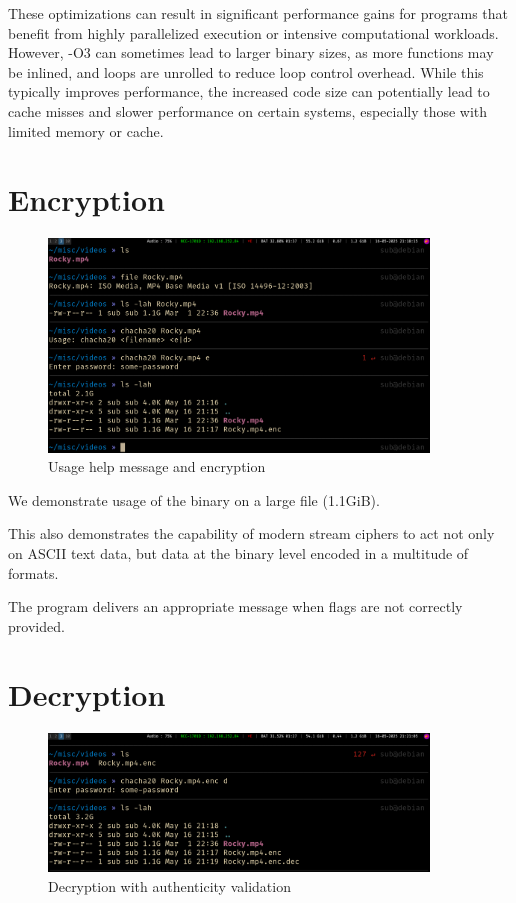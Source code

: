 \documentclass[a4paper,12pt]{report}
\begin{document}
These optimizations can result in significant performance gains for programs that benefit from highly parallelized execution or intensive computational workloads.
However, -O3 can sometimes lead to larger binary sizes, as more functions may be inlined, and loops are unrolled to reduce loop control overhead. While this typically improves performance, the increased code size can potentially lead to cache misses and slower performance on certain systems, especially those with limited memory or cache.

\section{Encryption}
\begin{figure}[h]
	\centering
	\includegraphics[width=0.9\textwidth]{../assets/2_encryption.png}
        \caption{Usage help message and encryption}
	\label{image}
\end{figure}

We demonstrate usage of the binary on a large file (1.1GiB).

This also demonstrates the capability of modern stream ciphers to act not only on ASCII text data, but data at the binary level encoded in a multitude of formats.

The program delivers an appropriate message when flags are not correctly provided.

\section{Decryption}
\begin{figure}[h]
	\centering
	\includegraphics[width=0.9\textwidth]{../assets/3_decryption.png}
        \caption{Decryption with authenticity validation}
	\label{image}
\end{figure}
\end{document}

